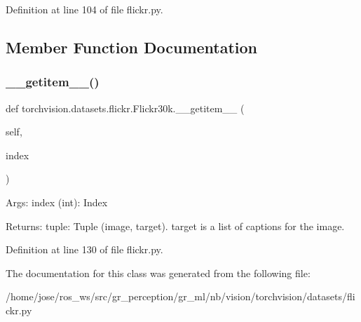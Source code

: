 Definition at line 104 of file flickr.\+py.



\subsection{Member Function Documentation}
\mbox{\label{classtorchvision_1_1datasets_1_1flickr_1_1Flickr30k_a869522ad69d0e5b5ba82a289d28f8477}} 
\subsubsection{\texorpdfstring{\+\_\+\+\_\+getitem\+\_\+\+\_\+()}{\_\_getitem\_\_()}}
{\footnotesize\ttfamily def torchvision.\+datasets.\+flickr.\+Flickr30k.\+\_\+\+\_\+getitem\+\_\+\+\_\+ (\begin{DoxyParamCaption}\item[{}]{self,  }\item[{}]{index }\end{DoxyParamCaption})}

\begin{DoxyVerb}Args:
    index (int): Index

Returns:
    tuple: Tuple (image, target). target is a list of captions for the image.
\end{DoxyVerb}
 

Definition at line 130 of file flickr.\+py.



The documentation for this class was generated from the following file\+:\begin{DoxyCompactItemize}
\item 
/home/jose/ros\+\_\+ws/src/gr\+\_\+perception/gr\+\_\+ml/nb/vision/torchvision/datasets/flickr.\+py\end{DoxyCompactItemize}
